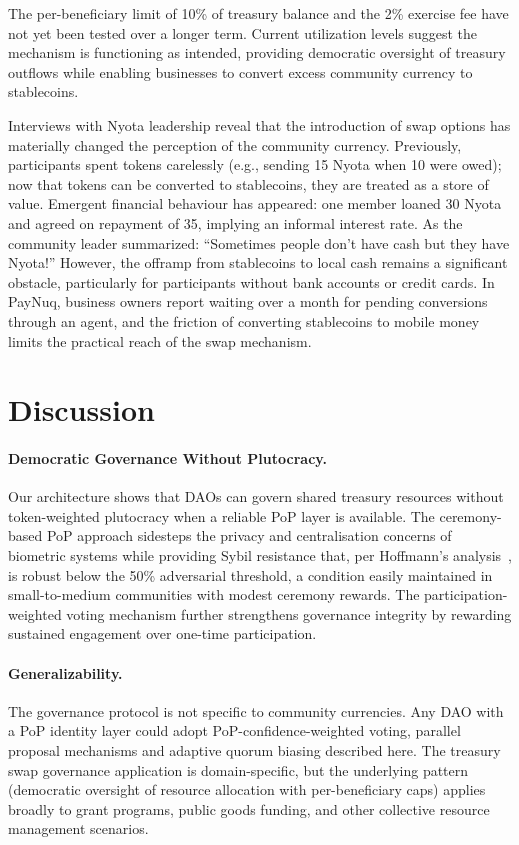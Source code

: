 \documentclass{svproc}
\begin{document}
The per-beneficiary limit of 10\% of treasury balance and the 2\% exercise fee have not yet been tested over a longer term. Current utilization levels suggest the mechanism is functioning as intended, providing democratic oversight of treasury outflows while enabling businesses to convert excess community currency to stablecoins.

Interviews with Nyota leadership reveal that the introduction of swap options has materially changed the perception of the community currency. Previously, participants spent tokens carelessly (e.g., sending 15 Nyota when 10 were owed); now that tokens can be converted to stablecoins, they are treated as a store of value. Emergent financial behaviour has appeared: one member loaned 30 Nyota and agreed on repayment of 35, implying an informal interest rate. As the community leader summarized: ``Sometimes people don't have cash but they have Nyota!'' However, the offramp from stablecoins to local cash remains a significant obstacle, particularly for participants without bank accounts or credit cards. In PayNuq, business owners report waiting over a month for pending conversions through an agent, and the friction of converting stablecoins to mobile money limits the practical reach of the swap mechanism.

\section{Discussion}
\label{sec:discussion}

\paragraph{Democratic Governance Without Plutocracy.}
Our architecture shows that DAOs can govern shared treasury resources without token-weighted plutocracy when a reliable PoP layer is available. The ceremony-based PoP approach sidesteps the privacy and centralisation concerns of biometric systems while providing Sybil resistance that, per Hoffmann's analysis~\cite{hoffmann2021security}, is robust below the 50\% adversarial threshold, a condition easily maintained in small-to-medium communities with modest ceremony rewards. The participation-weighted voting mechanism further strengthens governance integrity by rewarding sustained engagement over one-time participation.

\paragraph{Generalizability.}
The governance protocol is not specific to community currencies. Any DAO with a PoP identity layer could adopt PoP-confidence-weighted voting, parallel proposal mechanisms and adaptive quorum biasing described here. The treasury swap governance application is domain-specific, but the underlying pattern (democratic oversight of resource allocation with per-beneficiary caps) applies broadly to grant programs, public goods funding, and other collective resource management scenarios.
\end{document}
